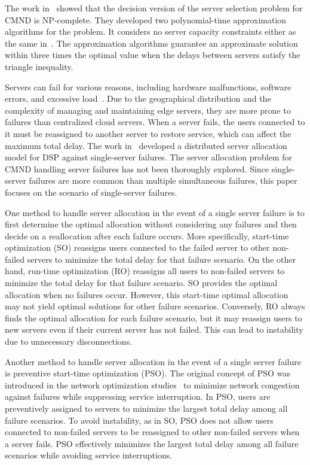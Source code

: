 \documentclass[10pt, letterpaper]{IEEEtran}
\begin{document}
\begin{CJK}{UTF8}{ipxm}
The work in~\cite{Oda_CMND2025} showed that the decision version of the server selection problem for CMND is NP-complete.
They developed two polynomial-time approximation algorithms for the problem. It considers no server capacity constraints either as the same in~\cite{3Ito2018}.
The approximation algorithms guarantee an approximate solution within three times the optimal value when the delays between servers satisfy the triangle inequality.

Servers can fail for various reasons, including hardware malfunctions, software errors, and excessive load~\cite{5_9_8_Shi2016}. 
Due to the geographical distribution and the complexity of managing and maintaining edge servers, they are more prone to failures than centralized cloud servers.
When a server fails, the users connected to it must be reassigned to another server to restore service, which can affect the maximum total delay.
The work in~\cite{5_9_Masuda2020} developed a distributed server allocation model for DSP against single-server failures. %
The server allocation problem for CMND handling server failures has not been thoroughly explored.
Since single-server failures are more common than multiple simultaneous failures, this paper focuses on the scenario of single-server failures.

One method to handle server allocation in the event of a single server failure is to first determine the optimal allocation without considering any failures and then decide on a reallocation after each failure occurs.
More specifically, start-time optimization (SO) reassigns users connected to the failed server to other non-failed servers to minimize the total delay for that failure scenario. On the other hand, 
run-time optimization (RO) reassigns all users to non-failed servers to minimize the total delay for that failure scenario.
SO provides the optimal allocation when no failures occur.
However, this start-time optimal allocation may not yield optimal solutions for other failure scenarios.
Conversely, RO always finds the optimal allocation for each failure scenario, but it may reassign users to new servers even if their current server has not failed.
This can lead to instability due to unnecessary disconnections.

Another method to handle server allocation in the event of a single server failure is preventive start-time optimization (PSO). The original concept of PSO was introduced in the network optimization studies~\cite{5_9_13_Kamrul2010,OkiDRCN2014} to minimize network congestion against failures while suppressing service interruption.
In PSO, users are preventively assigned to servers to minimize the largest total delay among all failure scenarios. 
To avoid instability, as in SO, PSO does not allow users connected to non-failed servers to be reassigned to other non-failed servers when a server fails.
PSO effectively minimizes the largest total delay among all failure scenarios while avoiding service interruptions.


\end{CJK}
\end{document}
